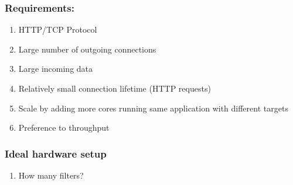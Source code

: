 \subsubsection{Requirements:}
\begin{enumerate}
    \item HTTP/TCP Protocol
    \item Large number of outgoing connections
    \item Large incoming data
    \item Relatively small connection lifetime (HTTP requests)
    \item Scale by adding more cores running same application with different
        targets
    \item Preference to throughput
\end{enumerate}

\subsubsection{Ideal hardware setup}
\begin{enumerate}
    \item How many filters?
\end{enumerate}


